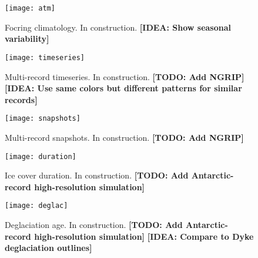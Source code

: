 \documentclass[tc, ms]{copernicus}
\def\idea#1{\textcolor[rgb]{0,0.5,0}{\textbf{[IDEA: #1]}}}
\def\todo#1{\textcolor[rgb]{0.5,0,0}{\textbf{[TODO: #1]}}}
\begin{document}
\begin{figure}
  \texttt{[image: atm]}
  \caption{Focring climatology. In construction.
           \idea{Show seasonal variability}}
  \label{fig:atm}
\end{figure}

\begin{figure}
  \texttt{[image: timeseries]}
  \caption{Multi-record timeseries. In construction.
           \todo{Add NGRIP}
           \idea{Use same colors but different patterns for similar records}}
  \label{fig:timeseries}
\end{figure}

\begin{figure}
  \texttt{[image: snapshots]}
  \caption{Multi-record snapshots. In construction.
           \todo{Add NGRIP}}
  \label{fig:snapshots}
\end{figure}

\begin{figure}
  \texttt{[image: duration]}
  \caption{Ice cover duration. In construction.
           \todo{Add Antarctic-record high-resolution simulation}}
  \label{fig:duration}
\end{figure}

\begin{figure}
  \texttt{[image: deglac]}
  \caption{Deglaciation age. In construction.
           \todo{Add Antarctic-record high-resolution simulation}
           \idea{Compare to Dyke deglaciation outlines}}
  \label{fig:deglac}
\end{figure}

\end{document}
